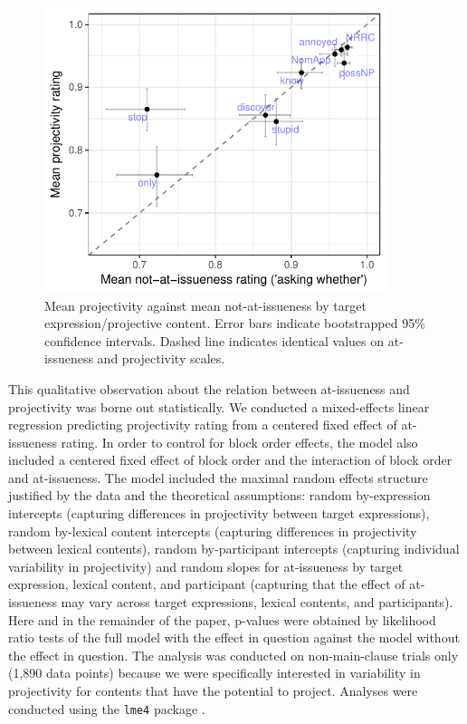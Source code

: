 \documentclass[11pt,fleqn]{article}
\newcommand{\6}{\mbox{$[\hspace*{-.6mm}[$}}
\newcommand{\9}{\mbox{$]\hspace*{-.6mm}]$}}
\begin{document}
\begin{figure}[!h]

\begin{center}
\includegraphics[width=10cm]{../results/exp1a/graphs/ai-proj-bytrigger-labels}
\end{center}

\caption{Mean projectivity against mean not-at-issueness by target expression/projective content. Error bars indicate bootstrapped 95\% confidence intervals. Dashed line indicates identical values on at-issueness and projectivity scales.}
\label{fig:f-proj-ai-1a}
\end{figure}

This qualitative observation about the relation between at-issueness and projectivity was borne out statistically. We conducted a mixed-effects linear regression predicting projectivity rating from a centered fixed effect of at-issueness rating. In order to control for block order effects, the model also included a centered fixed effect of block order and the interaction of block order and at-issueness. The model included the maximal random effects structure justified by the data and the theoretical assumptions: random by-expression intercepts (capturing differences in projectivity between target expressions),  random by-lexical content intercepts (capturing differences in projectivity between lexical contents), random by-participant intercepts (capturing individual variability in projectivity) and random slopes for at-issueness by target expression, lexical content, and participant (capturing that the effect of at-issueness may vary across target expressions, lexical contents, and participants). Here and in the remainder of the paper, p-values were obtained by likelihood ratio tests of the full model with the effect in question against the model without the effect in question. The analysis was conducted on non-main-clause trials only (1,890 data points) because we were specifically interested in variability in projectivity for contents that have the potential to project. Analyses were conducted using the \verb|lme4| package \citep{bates2015}.
\end{document}
